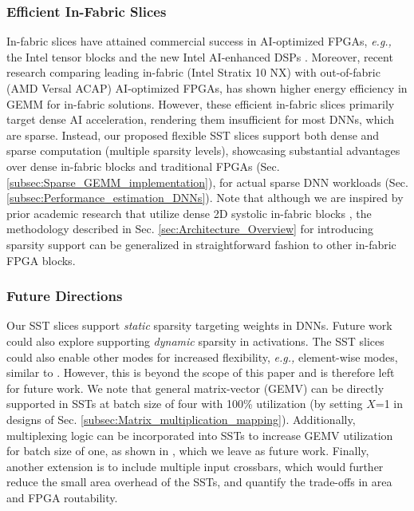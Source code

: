 \subsubsection{Efficient In-Fabric Slices} 
In-fabric slices have attained commercial success in 
AI-optimized FPGAs, \emph{e.g.,} the Intel tensor blocks \cite{Stratix_10_NX_FPGA_2021} and the new Intel AI-enhanced DSPs \cite{Sergey_Intel_TB_Agilex_5_FCCM_2024, Intel_Agilex_5_tensor_blocks}.
Moreover, recent research \cite{Versal_vs_Stratix_FCCM_2024} comparing leading in-fabric (Intel Stratix 10 NX) with out-of-fabric (AMD Versal ACAP) AI-optimized FPGAs, has shown higher energy efficiency in GEMM for in-fabric solutions. 
However, these efficient in-fabric slices primarily target dense AI acceleration, rendering them insufficient for most DNNs, which are sparse.
Instead, our proposed flexible SST slices support both dense and sparse computation (multiple sparsity levels), showcasing substantial advantages 
over dense in-fabric blocks and traditional FPGAs (Sec. \ref{subsec:Sparse_GEMM_implementation}), for actual sparse DNN workloads (Sec. \ref{subsec:Performance_estimation_DNNs}).
Note that although we are inspired by prior academic research that utilize dense 2D systolic in-fabric blocks \cite{TS_Aman_FPGA_2021, Aman_TS_TRETS_2022}, the methodology described in Sec. \ref{sec:Architecture_Overview} for introducing sparsity support can be generalized in straightforward fashion to other in-fabric FPGA blocks.





\subsubsection{Future Directions} 
Our SST slices support \textit{static} sparsity targeting weights in DNNs.
Future work could also explore supporting \textit{dynamic} sparsity in activations.
The SST slices could also enable other modes for increased flexibility, \emph{e.g.,} element-wise modes, similar to \cite{TS_Aman_FPGA_2021, Aman_TS_TRETS_2022}.
However, this is beyond the scope of this paper and is therefore left for future work.
We note that general matrix-vector (GEMV) can be directly supported in SSTs at batch size of four with 100\% utilization (by setting $X$=1 in designs of Sec. \ref{subsec:Matrix_multiplication_mapping}). 
Additionally, multiplexing logic can be incorporated into SSTs to increase GEMV utilization for batch size of one, as shown in \cite{Aman_TS_TRETS_2022}, which we leave as future work.
Finally, another extension is to include multiple input crossbars, which would further reduce the small area overhead of the SSTs, and quantify the trade-offs in area and FPGA routability.


